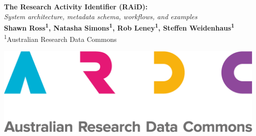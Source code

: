 \documentclass[a0,portrait]{a0poster}
\begin{document}

\setlength{\columnsep}{2cm}

\begin{multicols}{2}

\noindent
\vspace{0pt}
\Huge \color{ARDCBlue} \textbf{The Research Activity Identifier (RAiD):} \color{Black}\\[0.3cm]
\Large\textit{System architecture, metadata schema, workflows, and examples}\\[1cm]
\large \textbf{Shawn Ross\textsuperscript{1}, Natasha Simons\textsuperscript{1}, Rob Leney\textsuperscript{1}, Steffen Weidenhaus\textsuperscript{1}}\\[0.5cm]
\large \textsuperscript{1}Australian Research Data Commons

\vfill\null
\columnbreak
\raggedleft
\noindent\includegraphics[width=0.5\linewidth]{ARDC logo - RGB.png}

\end{multicols}     
\end{document}
